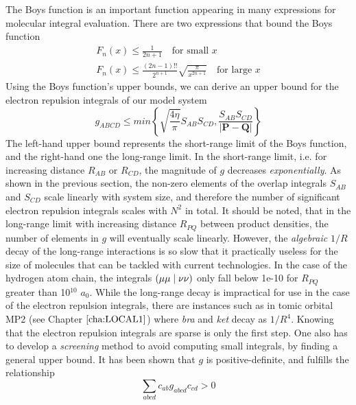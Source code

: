 \noindent The Boys function is an important function appearing in many expressions for molecular integral evaluation. There are two expressions that bound the Boys function
\begin{equation}
\begin{split}
F_n(x) \leq \frac{1}{2n+1} \quad \textrm{for small } x \\
F_n(x) \leq \frac{(2n-1)!!}{2^{n+1}}\sqrt{\frac{\pi}{x^{2n+1}}} \quad \textrm{for large } x 
\end{split}
\end{equation}
\noindent Using the Boys function's upper bounds, we can derive an upper bound for the electron repulsion integrals of our model system
\begin{equation}
g_{ABCD} \leq min \left\lbrace \sqrt{\frac{4\eta}{\pi}} S_{AB} S_{CD}, \frac{S_{AB} S_{CD}}{\left\lvert \mathbf{P} - \mathbf{Q} \right\rvert} \right\rbrace
\end{equation}
\noindent The left-hand upper bound represents the short-range limit of the Boys function, and the right-hand one the long-range limit. In the short-range limit, i.e. for increasing distance $R_{AB}$ or $R_{CD}$, the magnitude of $g$ decreases \emph{exponentially}. As shown in the previous section, the non-zero elements of the overlap integrals $S_{AB}$ and $S_{CD}$ scale linearly with system size, and therefore the number of significant electron repulsion integrals scales with $N^2$ in total. 
It should be noted, that in the long-range limit with increasing distance $R_{PQ}$ between product densities, the number of elements in $g$ will eventually scale linearly. However, the \emph{algebraic} $1/R$ decay of the long-range interactions is so slow that it practically useless for the size of molecules that can be tackled with current technologies. In the case of the hydrogen atom chain, the integrals $\left( \mu\mu \mid \nu\nu \right)$ only fall below 1e-10 for $R_{PQ}$ greater than 10$^{10}$ $a_0$. While the long-range decay is impractical for use in the case of the electron repulsion integrals, there are instances such as in tomic orbital MP2 (see Chapter $\ref{cha:LOCAL1}$) where \emph{bra} and \emph{ket} decay as $1/R^4$.
Knowing that the electron repulsion integrals are sparse is only the first step. One also has to develop a \emph{screening} method to avoid computing small integrals, by finding a general upper bound. It has been shown \cite{Roo1951} that $g$ is positive-definite, and fulfills the relationship
\begin{equation}
\sum_{abcd} c_{ab} g_{abcd} c_{cd} > 0
\end{equation}
